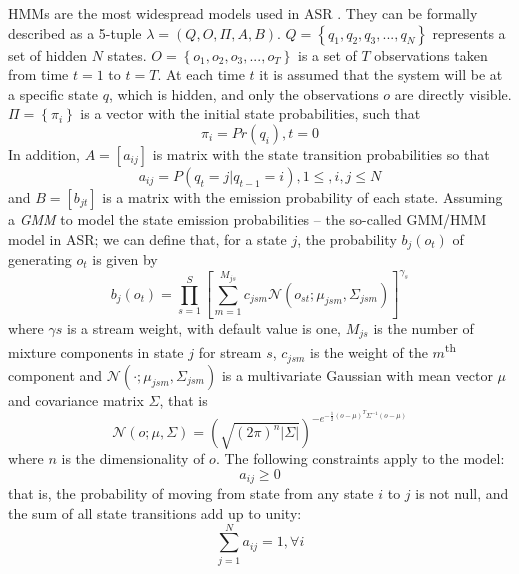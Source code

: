 \documentclass[twocolumn]{bmcart}%
\begin{document}
HMMs are the most widespread models used in ASR \cite{Juang2005}. They can be formally described as a 5-tuple $\lambda = \left (Q, O, \Pi, A, B\right )$. $Q = \left \{q_1, q_2, q_3, ..., q_N\right \}$ represents a set of hidden $N$ states. $O = \left \{o_1, o_2, o_3, ..., o_T\right \}$ is a set of $T$ observations taken from time $t = 1$ to $t = T$. At each time $t$ it is assumed that the system will be at a specific state $q$, which is hidden, and only the observations $o$ are directly visible. $\Pi = \left \{\pi_i \right \}$ is a vector with the initial state probabilities, such that
\begin{equation}
\pi_i = Pr(q_i), t = 0
\end{equation}
In addition, $A = [a_{ij}]$ is matrix with the state transition probabilities so that
\begin{equation}
a_{ij} = P(q_t = j | q_{t-1} = i),  1 \leq, i, j \leq N
\end{equation}
and $B = [b_{jt}]$ is a matrix with the emission probability of each state. Assuming a \emph{GMM} to model the state emission probabilities -- the so-called GMM/HMM model in ASR; we can define that, for a state $j$, the probability $b_j(o_t)$ of generating $o_t$ is given by
\begin{equation}
 b_j(o_t) = \prod_{s=1}^{S}\left [ \sum_{m=1}^{M_{js}} c_{jsm}\mathcal{N}(o_{st}; \mu_{jsm}, \Sigma_{jsm}) \right ]^{\gamma_s}
\end{equation}
where $\gamma s$ is a stream weight, with default value is one, $M_{js}$ is the number of mixture components in state $j$ for stream $s$, $c_{jsm}$ is the weight of the $m$\textsuperscript{th} component and $\mathcal{N}(\cdot; \mu_{jsm}, \Sigma_{jsm})$ is a multivariate Gaussian with mean vector $\mu$ and covariance matrix $\Sigma$, that is
\begin{equation}
 \mathcal{N}(o; \mu, \Sigma) = (\sqrt{(2\pi)^{n}\left |\Sigma\right |})^{-e^{-\frac{1}{2}(o-\mu)^{T}\Sigma^{-1}(o-\mu)}}
\end{equation}
where $n$ is the dimensionality of $o$. The following constraints apply to the model:
\begin{equation}
a_{ij} \geq 0
\end{equation}
that is, the probability of moving from state from any state $i$ to $j$ is not null, and the sum of all state transitions add up to unity:
\begin{equation}
\sum_{j=1}^{N} a_{ij} = 1, \forall i
\end{equation}
\end{document}
